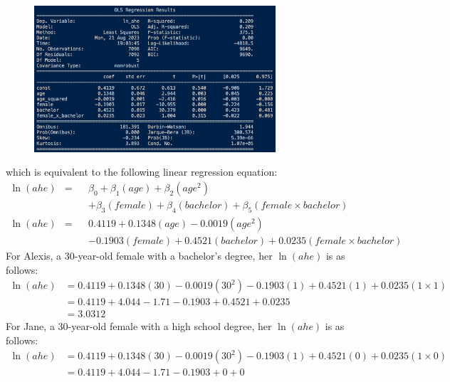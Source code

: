 \documentclass{uofa-eng-assignment}
\begin{document}
\begin{enumerate}
          \begin{figure}[H]
              \centering
              \includegraphics[width=0.80\textwidth]{final-exam-h-1.png}
          \end{figure}
          which is equivalent to the following linear regression equation:
          \begin{align*}
              \ln{(ahe)} & = &  & \beta_0 + \beta_1 (age) + \beta_2 (age^2)                                  \\
                         &   &  & + \beta_3 (female) + \beta_4 (bachelor) + \beta_5 (female \times bachelor) \\
              \ln{(ahe)} & = &  & 0.4119 + 0.1348 (age) - 0.0019 (age^2)                                     \\
                         &   &  & - 0.1903 (female) + 0.4521 (bachelor) + 0.0235 (female \times bachelor)
          \end{align*}
          For Alexis, a 30-year-old female with a bachelor's degree, her $\ln{(ahe)}$ is as follows:
          \begin{align*}
              \ln{(ahe)} & = 0.4119 + 0.1348 (30) - 0.0019 (30^2) - 0.1903 (1) + 0.4521 (1) + 0.0235 (1 \times 1) \\
                         & = 0.4119 + 4.044 - 1.71 - 0.1903 + 0.4521 + 0.0235                                     \\
                         & = \boldsymbol{3.0312}
          \end{align*}
          For Jane, a 30-year-old female with a high school degree, her $\ln{(ahe)}$ is as follows:
          \begin{align*}
              \ln{(ahe)} & = 0.4119 + 0.1348 (30) - 0.0019 (30^2) - 0.1903 (1) + 0.4521 (0) + 0.0235 (1 \times 0) \\
                         & = 0.4119 + 4.044 - 1.71 - 0.1903 + 0 + 0                                               \\

\end{align*}
\end{enumerate}
\end{document}
